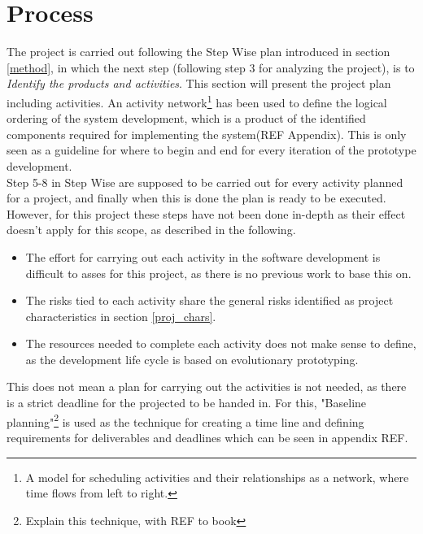 \section{Process}
\label{process}
The project is carried out following the Step Wise plan introduced in section \ref{method}, in which the next step (following step 3 for analyzing the project), is to \textit{Identify the products and activities}. This section will present the project plan including activities. An activity network\footnote{A model for scheduling activities and their relationships as a network, where time flows from left to right.} has been used to define the logical ordering of the system development, which is a product of the identified components required for implementing the system(REF Appendix). This is only seen as a guideline for where to begin and end for every iteration of the prototype development.\\

Step 5-8 in Step Wise are supposed to be carried out for every activity planned for a project, and finally when this is done the plan is ready to be executed. However, for this project these steps have not been done in-depth as their effect doesn't apply for this scope, as described in the following. 

\begin{itemize}
	\item The effort for carrying out each activity in the software development is difficult to asses for this project, as there is no previous work to base this on.
	\item The risks tied to each activity share the general risks identified as project characteristics in section \ref{proj_chars}.
	\item The resources needed to complete each activity does not make sense to define, as the development life cycle is based on evolutionary prototyping.
\end{itemize}

 This does not mean a plan for carrying out the activities is not needed, as there is a strict deadline for the projected to be handed in. For this, "Baseline planning"\footnote{Explain this technique, with REF to book} is used as the technique for creating a time line and defining requirements for deliverables and deadlines which can be seen in appendix REF. 

